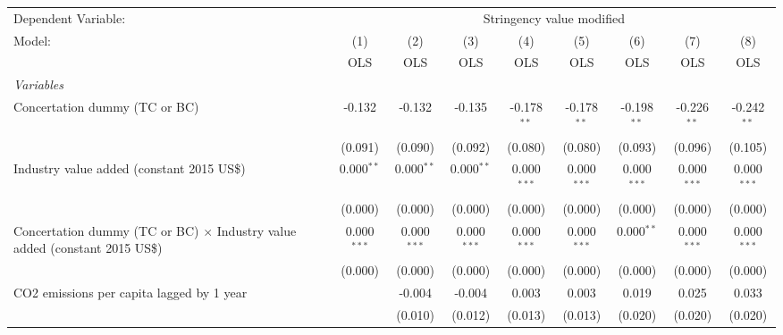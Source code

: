 
\begingroup
\centering
\begin{tabular}{lcccccccc}
   \toprule
   Dependent Variable: & \multicolumn{8}{c}{Stringency value modified}\\
   Model:                                                                             & (1)           & (2)           & (3)           & (4)           & (5)           & (6)           & (7)           & (8)\\  
                                                                                      &  OLS          & OLS           & OLS           & OLS           & OLS           & OLS           & OLS           & OLS\\  
   \midrule
   \emph{Variables}\\
   Concertation dummy (TC or BC)                                                      & -0.132        & -0.132        & -0.135        & -0.178$^{**}$ & -0.178$^{**}$ & -0.198$^{**}$ & -0.226$^{**}$ & -0.242$^{**}$\\   
                                                                                      & (0.091)       & (0.090)       & (0.092)       & (0.080)       & (0.080)       & (0.093)       & (0.096)       & (0.105)\\   
   Industry value added (constant 2015 US\$)                                          & 0.000$^{**}$  & 0.000$^{**}$  & 0.000$^{**}$  & 0.000$^{***}$ & 0.000$^{***}$ & 0.000$^{***}$ & 0.000$^{***}$ & 0.000$^{***}$\\   
                                                                                      & (0.000)       & (0.000)       & (0.000)       & (0.000)       & (0.000)       & (0.000)       & (0.000)       & (0.000)\\   
   Concertation dummy (TC or BC) $\times$ Industry value added (constant 2015 US\$)   & 0.000$^{***}$ & 0.000$^{***}$ & 0.000$^{***}$ & 0.000$^{***}$ & 0.000$^{***}$ & 0.000$^{**}$  & 0.000$^{***}$ & 0.000$^{***}$\\   
                                                                                      & (0.000)       & (0.000)       & (0.000)       & (0.000)       & (0.000)       & (0.000)       & (0.000)       & (0.000)\\   
   CO2 emissions per capita lagged by 1 year                                          &               & -0.004        & -0.004        & 0.003         & 0.003         & 0.019         & 0.025         & 0.033\\   
                                                                                      &               & (0.010)       & (0.012)       & (0.013)       & (0.013)       & (0.020)       & (0.020)       & (0.020)\\   

\end{tabular}
